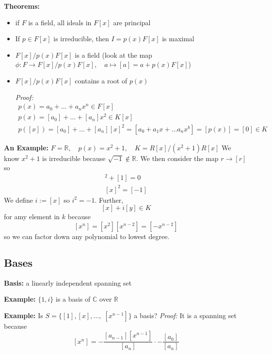 \documentclass[12pt]{report}
\newcommand{\R}{\mathbb{R}}
\newcommand{\C}{\mathbb{C}}
\renewcommand{\indent}{\hspace*{0.5in}}
\begin{document}
        \textbf{Theorems:}
        \begin{itemize}
            \item if $F$ is a field, all ideals in $F[x]$ are principal 
            \item If $p \in F[x]$ is irreducible, then $I = p(x)F[x]$ is maximal 
            \item $F[x]/p(x)F[x]$ is a field (look at the map $\phi: F \to F[x]/p(x)F[x],\quad a\mapsto [a] = a + p(x)F[x]$)
            \item $F[x]/p(x)F[x]$ contains a root of $p(x)$
            
            \indent \emph{Proof:}
            \begin{gather*}
                p(x) = a_0 + \dots + a_nx^n \in F[x]\\
                p(x) = [a_0] + \dots + [a_n] x^2 \in K[x]\\
                p([x]) = [a_0] + \dots + [a_n][x]^2 = [a_0 + a_1x + \dots a_nx^b] = [p(x)] = [0] \in K
            \end{gather*}
        \end{itemize}

        \textbf{An Example:} $F= \R, \quad p(x) = x^2 + 1, \quad K = R[x]/(x^2 + 1)R[x]$
            We know $x^2 + 1$ is irreducible because $\sqrt{-1} \not \in \R$. We then consider the map $r \to [r]$ so 
            \begin{gather}
                [x]^2 + [1] = 0\\
                [x]^2 = [-1]
            \end{gather}
            We define $i := [x]$ so $i^2 = -1$. Further, 
            \[[x] + i[y] \in K\]
            for amy element in $k$ because 
            \[[x^n] = [x^2][x^{n-2}] = [-x^{n-2}]\]
            so we can factor down any polynomial to lowest degree.

    \subsection*{Bases}
        \textbf{Basis:} a linearly independent spanning set
        
        \textbf{Example:} $\{1, i\}$ is a basis of $\C$ over $\R$ 

        \textbf{Example:} Is $S = \{[1], [x], \dots,\; [x^{n-1}]\}$ a basis? 
        \indent \emph{Proof:} It is a spanning set because 
        \[[x^n] = -\frac{[a_{n-1}] [x^{n-1}]}{[a_n]} \cdot -\frac{[a_0]}{[a_n]}\]
\end{document}
